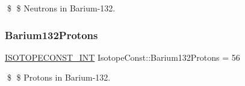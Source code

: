 \$ \$ Neutrons in Barium-\/132. \mbox{\label{group___isotope_const-_barium-_ba132_ga597b3280a5a1a0a220fef4b1717fcbf7}} 
\subsubsection{\texorpdfstring{Barium132\+Protons}{Barium132Protons}}
{\footnotesize\ttfamily \mbox{\hyperlink{group___isotope_const-_macros_ga5f18360b3e99483a35c32d789e62621c}{I\+S\+O\+T\+O\+P\+E\+C\+O\+N\+S\+T\+\_\+\+I\+NT}} Isotope\+Const\+::\+Barium132\+Protons = 56}

\$ \$ Protons in Barium-\/132. 